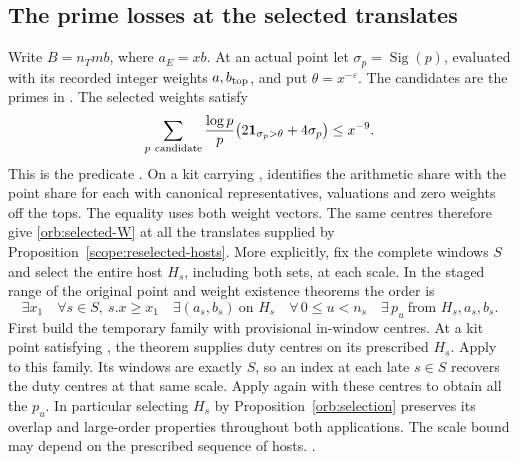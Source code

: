 \subsection{The prime losses at the selected translates}
\label{orb:selected-loss}

Write \(B=n_Tmb\), where \(a_E=xb\). At an actual point let
\(\sigma_p=\operatorname{Sig}(p)\), evaluated with its recorded integer
weights \(a,b_{\rm top}\), and put \(\theta=x^{-\varepsilon}\).
The candidates are the primes in . The selected weights satisfy
\begin{equation}\label{orb:selected-W}
 \sum_{p\ \mathrm{candidate}}\frac{\log p}{p}
       \bigl(2{\bf1}_{\sigma_p>\theta}+4\sigma_p\bigr)
       \le x^{-9}.
\end{equation}
This is the predicate . On a kit carrying ,
 identifies the arithmetic share with the point
share for each  with canonical representatives, valuations
and zero weights off the tops. The equality uses both weight vectors.
The same centres therefore give \eqref{orb:selected-W} at all the
translates supplied by Proposition~\ref{scope:reselected-hosts}.
More explicitly, fix the complete windows \(S\) and select the entire
host \(H_s\), including both sets, at each scale. In the staged range
of the original point and weight existence theorems the order is
\[
   \exists x_1\quad\forall s\in S,\ s.x\ge x_1\quad
   \exists(a_s,b_s)\ \text{on }H_s\quad
   \forall\,0\le u<n_s\quad\exists\,p_u\ \text{from }H_s,a_s,b_s .
\]
First build the temporary family with provisional in-window centres.
At a kit point satisfying , the theorem
 supplies duty
centres on its prescribed \(H_s\). Apply  to this family.
Its windows are exactly \(S\), so an index at each late \(s\in S\)
recovers the duty centres at that same scale. Apply 
again with these centres to obtain all the \(p_u\).
In particular selecting \(H_s\) by Proposition~\ref{orb:selection}
preserves its overlap and large-order properties throughout both
applications. The scale bound may depend on the prescribed sequence
of hosts.
.

